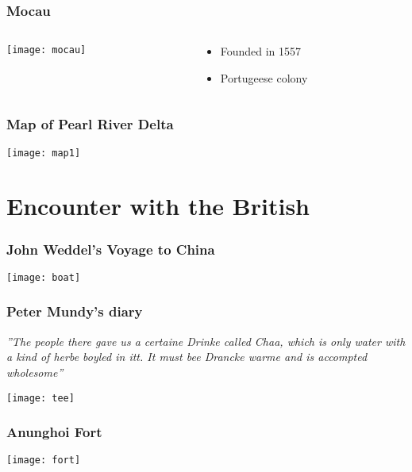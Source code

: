 \documentclass[9pt]{beamer}
\begin{document}
\begin{frame}
	\frametitle{Mocau}

	\begin{columns}
		\begin{column}{.5\textwidth}
			\texttt{[image: mocau]}
		\end{column}
		\begin{column}{.5\textwidth}
			\begin{itemize}
				\item Founded in 1557
				\item Portugeese colony	
			\end{itemize}
		\end{column}
	\end{columns}

	\note{
	}
\end{frame}

\begin{frame}
	\frametitle{Map of Pearl River Delta}
	\centering
	\texttt{[image: map1]}

\end{frame}

\section{Encounter with the British}

\begin{frame}
	\frametitle{John Weddel's Voyage to China}
	\texttt{[image: boat]}
\end{frame}

\begin{frame}
	\frametitle{Peter Mundy's diary}
	\LARGE
	\centering
	\vspace{1em}
	\textit{''The people there gave us a certaine Drinke called Chaa,
	which is only water with a kind of herbe boyled in itt. It must bee Drancke warme and is accompted wholesome''}

	\pause
	\vspace{0.5em}
	\texttt{[image: tee]}

\end{frame}

\begin{frame}
	\frametitle{Anunghoi Fort}

	\centering
	\texttt{[image: fort]}

\end{frame}
\end{document}
